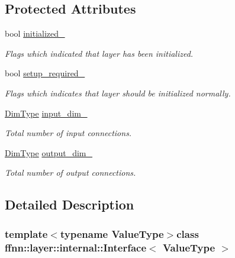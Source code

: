 \subsection*{Protected Attributes}
\begin{DoxyCompactItemize}
\item 
bool \hyperlink{classffnn_1_1layer_1_1internal_1_1_interface_a48c80e6608e9e20dfe2665abd55cd7ba}{initialized\-\_\-}
\begin{DoxyCompactList}\small\item\em Flags which indicated that layer has been initialized. \end{DoxyCompactList}\item 
bool \hyperlink{classffnn_1_1layer_1_1internal_1_1_interface_a57f0de55599c9b6621a66096b5662ca8}{setup\-\_\-required\-\_\-}
\begin{DoxyCompactList}\small\item\em Flags which indicates that layer should be initialized normally. \end{DoxyCompactList}\item 
\hyperlink{classffnn_1_1layer_1_1internal_1_1_interface_a8d121d0103f254b51e48f7b20a17681f}{Dim\-Type} \hyperlink{classffnn_1_1layer_1_1internal_1_1_interface_aa011c369e00d2b78a87b94904e596f15}{input\-\_\-dim\-\_\-}
\begin{DoxyCompactList}\small\item\em Total number of input connections. \end{DoxyCompactList}\item 
\hyperlink{classffnn_1_1layer_1_1internal_1_1_interface_a8d121d0103f254b51e48f7b20a17681f}{Dim\-Type} \hyperlink{classffnn_1_1layer_1_1internal_1_1_interface_a2540e4455843a2100efe4c7de9a62df0}{output\-\_\-dim\-\_\-}
\begin{DoxyCompactList}\small\item\em Total number of output connections. \end{DoxyCompactList}\end{DoxyCompactItemize}


\subsection{Detailed Description}
\subsubsection*{template$<$typename Value\-Type$>$class ffnn\-::layer\-::internal\-::\-Interface$<$ Value\-Type $>$}

